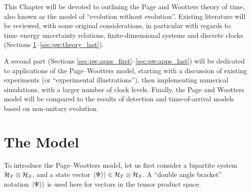 
This Chapter
will be devoted to outlining the Page and Wootters theory
of time,
also known as the model of ``evolution without evolution''.
Existing literature will be reviewed,
with some original considerations,
in particular with regards to
time--energy uncertainty relations,
finite-dimensional systems and discrete clocks
(Sections \ref{sec:pw:theory_first}--\ref{sec:pw:theory_last}).

A second part
(Sections \ref{sec:pw:apps_first}--\ref{sec:pw:apps_last})
will be dedicated to
applications of the Page--Wootters model, starting with a discussion of existing
experiments (or ``experimental illustrations''),
then implementing numerical simulations, with a larger number of clock levels.
Finally, the Page and Wootters model will be compared to the results of
detection and time-of-arrival models
based on non-unitary evolution.

\section{The Model}\label{sec:pw:theory_first}

To introduce the Page--Wootters model, let us first consider
a bipartite system $\mathcal{H}_T \otimes \mathcal{H}_S$,
and a state vector $\left.\left| \Psi \right\rangle\right\rangle \in \mathcal{H}_T \otimes \mathcal{H}_S$.
A ``double angle bracket'' notation $\left.\left| \Psi \right\rangle\right\rangle$ is used here
for vectors in the tensor product space.

